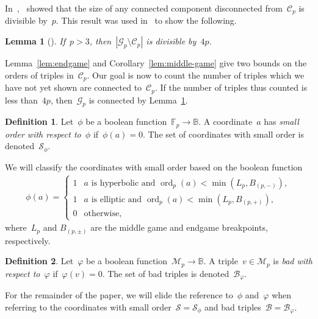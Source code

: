 \documentclass{article}
\DeclareMathOperator{\ord}{ord}
\newtheorem{lemma}{Lemma}
\theoremstyle{definition}
\newtheorem{definition}{Definition}
\theoremstyle{remark}
\begin{document}
In~\cite{chen},~\citeauthor{chen} showed that the size of any connected component disconnected from~$\mathcal{C}_p$ is divisible by~$p$.
This result was used in~\cite{fuchs} to show the following.

\begin{lemma}[{\cite[Lemma 2.2]{fuchs}}]\label{lem:connected-component}
    If~$p > 3$, then~$|\mathcal{G}_p \setminus \mathcal{C}_p|$ is divisible by~$4p$.
\end{lemma}

Lemma~\ref{lem:endgame} and Corollary~\ref{lem:middle-game} give two bounds on the orders of triples in~$\mathcal{C}_p$.
Our goal is now to count the number of triples which we have not yet shown are connected to~$\mathcal{C}_p$.
If the number of triples thus counted is less than~$4p$, then~$\mathcal{G}_p$ is connected by Lemma~\ref{lem:connected-component}.

\begin{definition}\label{def:small-coord}
    Let~$\phi$ be a boolean function~$\mathbb{F}_p \to \mathbb{B}$.
    A coordinate~$a$ has \textit{small order with respect to~$\phi$} if~$\phi(a) = 0$.
    The set of coordinates with small order is denoted~$\mathcal{S}_\phi$.
\end{definition}

We will classify the coordinates with small order based on the boolean function
\begin{align*}
    \phi(a) =
    \begin{cases}
        1 & a \text{\ is hyperbolic and } \ord_p(a) < \min(L_p, B_{(p,-)}), \\
        1 & a \text{\ is elliptic and } \ord_p(a) < \min(L_p, B_{(p,+)}), \\
        0 & \text{otherwise},
    \end{cases}
\end{align*}
where~$L_p$ and $B_{(p,\pm)}$ are the middle game and endgame breakpoints, respectively.

\begin{definition}\label{def:bad-triples}
    Let~$\varphi$ be a boolean function~$\mathcal{M}_p \to \mathbb{B}$.
    A triple~$v \in \mathcal{M}_p$ is \textit{bad with respect to~$\varphi$} if~$\varphi(v) = 0$.
    The set of bad triples is denoted~$\mathcal{B}_\varphi$.
\end{definition}

For the remainder of the paper, we will elide the reference to~$\phi$ and~$\varphi$ when referring to the coordinates with small order~$\mathcal{S} = \mathcal{S}_\phi$ and bad triples~$\mathcal{B} = \mathcal{B}_\varphi$.
\end{document}
